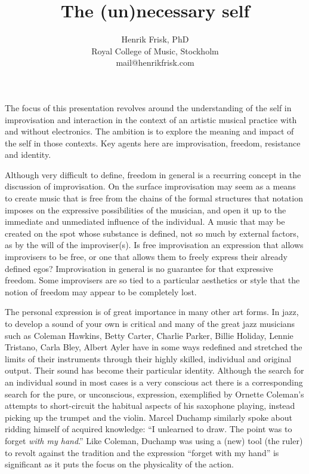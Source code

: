 \documentclass[a4paper]{article}
\title{The (un)necessary self\\\vspace{.6cm}}
\author{Henrik Frisk, PhD\\{\small Royal College of Music, Stockholm}\\{\small mail@henrikfrisk.com}}
\date{}
\begin{document}
\maketitle

\thispagestyle{empty}


\noindent



The focus of this presentation revolves around the understanding of the self in improvisation and interaction in the context of an artistic musical practice with and without electronics. The ambition is to explore the meaning and impact of the self in those contexts. Key agents here are improvisation, freedom, resistance and identity. 

Although very difficult to define, freedom in general is a recurring concept in the discussion of improvisation. On the surface improvisation may seem as a means to create music that is free from the chains of the formal structures that notation imposes on the expressive possibilities of the musician, and open it up to the immediate and unmediated influence of the individual. A music that may be created on the spot whose substance is defined, not so much by external factors, as by the will of the improviser(s). Is free improvisation an expression that allows improvisers to be free, or one that allows them to freely express their already defined egos? Improvisation in general is no guarantee for that expressive freedom. Some improvisers are so tied to a particular aesthetics or style that the notion of freedom may appear to be completely lost.

The personal expression is of great importance in many other art forms. In jazz, to develop a sound of your own is critical and many of the great jazz musicians such as Coleman Hawkins, Betty Carter, Charlie Parker, Billie Holiday, Lennie Tristano, Carla Bley, Albert Ayler have in some ways redefined and stretched the limits of their instruments through their highly skilled, individual and original output. Their sound has become their particular identity. Although the search for an individual sound in most cases is a very conscious act there is a corresponding search for the pure, or unconscious, expression, exemplified by Ornette Coleman's attempts to short-circuit the habitual aspects of his saxophone playing, instead picking up the trumpet and the violin. Marcel Duchamp similarly spoke about ridding himself of acquired knowledge: ``I unlearned to draw. The  point was to forget \emph{with my hand}.'' Like Coleman, Duchamp was using a (new) tool (the ruler) to revolt against the tradition and the expression ``forget with my hand'' is significant as it puts the focus on the physicality of the action.
\end{document}
